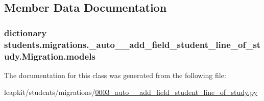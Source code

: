 \subsection{Member Data Documentation}
\hypertarget{classstudents_1_1migrations_1_10003__auto____add__field__student__line__of__study_1_1_migration_a1656f729c63dfbc632ab6070a4d7a813}{
\subsubsection[{models}]{\setlength{\rightskip}{0pt plus 5cm}dictionary students.\-migrations.\-\_\-auto\-\_\-\-\_\-add\-\_\-field\-\_\-student\-\_\-line\-\_\-of\-\_\-study.\-Migration.\-models\hspace{0.3cm}{\ttfamily [static]}}}\label{classstudents_1_1migrations_1_10003__auto____add__field__student__line__of__study_1_1_migration_a1656f729c63dfbc632ab6070a4d7a813}


The documentation for this class was generated from the following file\-:\begin{DoxyCompactItemize}
\item 
leapkit/students/migrations/\hyperlink{0003__auto____add__field__student__line__of__study_8py}{0003\-\_\-auto\-\_\-\-\_\-add\-\_\-field\-\_\-student\-\_\-line\-\_\-of\-\_\-study.\-py}\end{DoxyCompactItemize}
